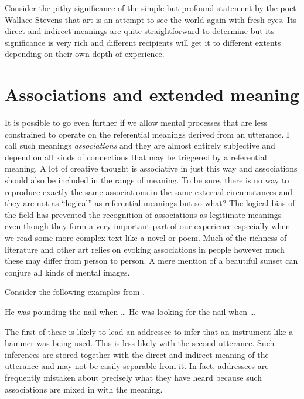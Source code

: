 Consider the pithy significance of the simple but profound statement by the poet Wallace Stevens that art is an attempt to see the world again with fresh eyes. Its direct and indirect meanings are quite straightforward to determine but its significance is very rich and different recipients will get it to different extents depending on their own depth of experience.


\section{Associations and extended meaning} 

It is possible to go even further if we allow mental processes that are less constrained to operate on the  referential meanings derived from an utterance. I call such meanings \emph{associations} and they are almost entirely subjective and depend on all kinds of connections that may be triggered by a referential meaning. A lot of creative thought is associative in just this way and associations should also be included in the range of meaning. To be sure, there is no way to reproduce exactly the same associations in the same external circumstances and they are not as ``logical'' as referential meanings but so what? The logical bias of the field has prevented the recognition of associations as legitimate meanings even though they form a very important part of our experience especially when we read some more complex text like a novel or poem. Much of the richness of literature and other art relies on evoking associations in people however much these may differ from person to person. A mere mention of a beautiful sunset can conjure all kinds of mental images.


Consider the following examples from \citet[244--245]{fsc:fp}.

\ea
\ea He was pounding the nail when \ldots
\ex He was looking for the nail when \ldots
\z
\z

\noindent The first of these is likely to lead an addressee to infer that an instrument like a hammer was being used. This is less likely with the second utterance. Such inferences are stored together with the direct and indirect meaning of the utterance and may not be easily separable from it. In fact, addressees are frequently mistaken about precisely what they have heard because such associations are mixed in with the meaning.

